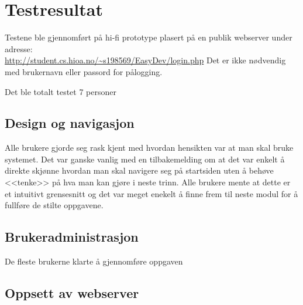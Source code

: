 \section{Testresultat}
Testene ble gjennomført på hi-fi prototype plasert på en publik webserver under adresse:\\ \url{http://student.cs.hioa.no/~s198569/EasyDev/login.php} 
Det er ikke nødvendig med brukernavn eller passord for pålogging.

Det ble totalt testet 7 personer
\subsection{Design og navigasjon}
Alle brukere gjorde seg rask kjent med hvordan hensikten var at man skal bruke systemet. Det var ganske vanlig med en tilbakemelding om at det var enkelt å direkte skjønne hvordan man skal navigere seg på startsiden uten å behøve <<tenke>> på hva man kan gjøre i neste trinn. Alle brukere mente at dette er et intuitivt grensesnitt og det var meget enekelt å finne frem til neste modul for å fullføre de stilte oppgavene.

\subsection{Brukeradministrasjon}
De fleste brukerne klarte å gjennomføre oppgaven

\subsection{Oppsett av webserver}